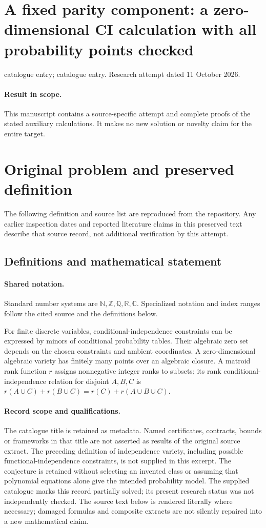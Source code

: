 \documentclass[11pt]{article}
\begin{document}
\section*{A fixed parity component: a zero-dimensional CI calculation with all probability points checked}
\noindent catalogue entry; catalogue entry. Research attempt dated 11 October 2026.
\paragraph{Result in scope.}This manuscript contains a source-specific attempt and complete proofs of the stated auxiliary calculations. It makes no new solution or novelty claim for the entire target.
\section{Original problem and preserved definition}
The following definition and source list are reproduced from the repository. Any earlier inspection dates and reported literature claims in this preserved text describe that source record, not additional verification by this attempt.
\subsection{Definitions and mathematical statement}

\paragraph{Shared notation.}Standard number systems are $\mathbb N,\mathbb Z,\mathbb Q,\mathbb R,\mathbb C$. Specialized notation and index ranges follow the cited source and the definitions below.


For finite discrete variables, conditional-independence constraints can be expressed by minors of conditional probability tables. Their algebraic zero set depends on the chosen constraints and ambient coordinates. A zero-dimensional algebraic variety has finitely many points over an algebraic closure. A matroid rank function $r$ assigns nonnegative integer ranks to subsets; its rank conditional-independence relation for disjoint $A,B,C$ is $r(A\cup C)+r(B\cup C)=r(C)+r(A\cup B\cup C)$.
\paragraph{Record scope and qualifications.}
The catalogue title is retained as metadata. Named certificates, contracts, bounds or frameworks in that title are not asserted as results of the original source extract.
The preceding definition of independence variety, including possible functional-independence constraints, is not supplied in this excerpt. The conjecture is retained without selecting an invented class or assuming that polynomial equations alone give the intended probability model. The supplied catalogue marks this record partially solved; its present research status was not independently checked.
The source text below is rendered literally where necessary; damaged formulas and composite extracts are not silently repaired into a new mathematical claim.
\end{document}
